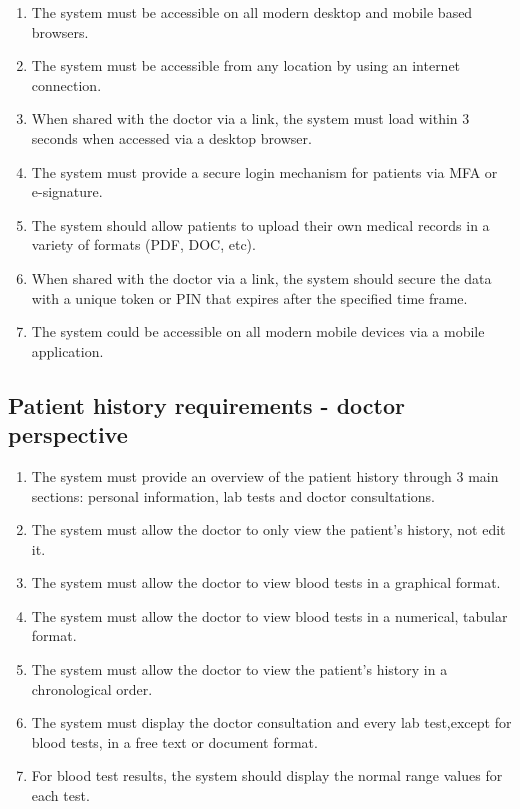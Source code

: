 \begin{enumerate}
    \item The system must be accessible on all modern desktop and mobile based browsers.
    \item The system must be accessible from any location by using an internet connection.
    \item When shared with the doctor via a link, the system must load within 3 seconds when accessed via a desktop browser.
    \item The system must provide a secure login mechanism for patients via MFA or e-signature.
    \item The system should allow patients to upload their own medical records in a variety of formats (PDF, DOC, etc).
    \item When shared with the doctor via a link, the system should secure the data with a unique token or PIN that expires after the specified time frame.
    \item The system could be accessible on all modern mobile devices via a mobile application.
\end{enumerate}

\subsection{Patient history requirements - doctor perspective}
\begin{enumerate}
    \item The system must provide an overview of the patient history through 3 main sections: personal information, lab tests and doctor consultations.
    \item The system must allow the doctor to only view the patient's history, not edit it.
    \item The system must allow the doctor to view blood tests in a graphical format.
    \item The system must allow the doctor to view blood tests in a numerical, tabular format.
    \item The system must allow the doctor to view the patient's history in a chronological order.
    \item The system must display the doctor consultation and every lab test,except for blood tests, in a free text or document format.
    \item For blood test results, the system should display the normal range values for each test.
\end{enumerate}

